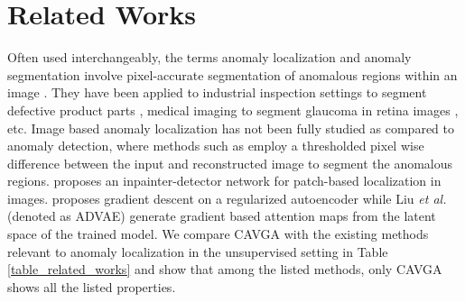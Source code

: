 \documentclass[runningheads]{llncs}
\begin{document}
\section{Related Works}

Often used interchangeably, the terms anomaly localization and anomaly segmentation involve pixel-accurate segmentation of anomalous regions within an image \cite{bergmann2019mvtec}. They have been applied to industrial inspection settings to segment defective product parts \cite{bergmann2019mvtec}, medical imaging  to segment glaucoma in retina images \cite{Li_2019_CVPR}, etc. Image based anomaly localization has not been fully studied as compared to anomaly detection, where methods such as \cite{akcay2018ganomaly, schlegl2017unsupervised, bergmann2018improving,ravanbakhsh2019training, baur2018deep} employ a thresholded pixel wise difference between the input and reconstructed image to segment the anomalous regions. \cite{sabokrou2018avid} proposes an inpainter-detector network for patch-based localization in images. \cite{dehaene2020iterative} proposes gradient descent on a regularized autoencoder  while Liu \textit{et al.} \cite{liu2019towards} (denoted as ADVAE) generate gradient based attention maps from the latent space of the trained model.
We compare CAVGA with the existing methods relevant to anomaly localization in the unsupervised setting in Table \ref{table_related_works}  and show that among the listed methods, only CAVGA shows all the listed properties.
\end{document}
